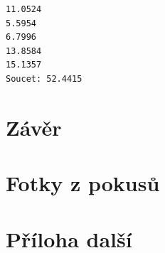 \documentclass[12pt]{report}			%
\begin{document}
\lipsum[1]

\begin{lstlisting}[numbers=none, title={Příklad výstupního souboru}]
11.0524
5.5954
6.7996
13.8584
15.1357
Soucet: 52.4415
\end{lstlisting}

	\chapter*{Závěr}
	
		\lipsum[1]
	
	\nocite{*}
    \printbibliography					%
    \printglossary[title={Zkratky}]		%
    \listoffigures						%
    \listoftables						%

    \begin{appendices}
	\chapter{Fotky z pokusů}	
	\lipsum[1]
	\chapter{Příloha další }
	\end{appendices}
\end{document}
